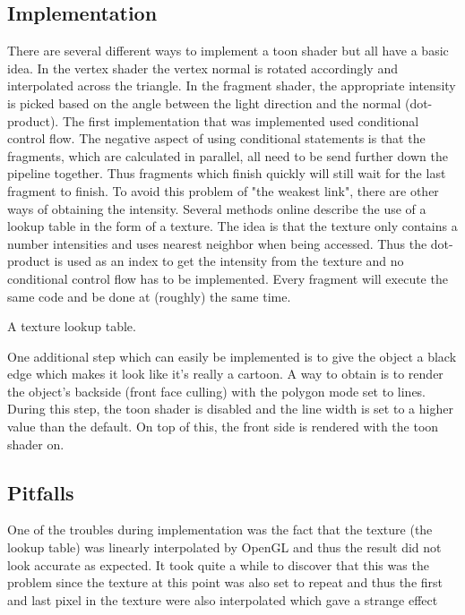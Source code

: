 \documentclass[a4paper,12pt]{article}
\begin{document}
\subsection{Implementation}
\label{sec:ImplementationToonShader}

There are several different ways to implement a toon shader but all have a basic idea. In the vertex shader the vertex normal is rotated accordingly and interpolated across the triangle. In the fragment shader, the appropriate intensity is picked based on the angle between the light direction and the normal (dot-product). The first implementation that was implemented used conditional control flow. The negative aspect of using conditional statements is that the fragments, which are calculated in parallel, all need to be send further down the pipeline together. Thus fragments which finish quickly will still wait for the last fragment to finish. To avoid this problem of "the weakest link", there are other ways of obtaining the intensity. Several methods online describe the use of a lookup table in the form of a texture. The idea is that the texture only contains a number intensities and uses nearest neighbor when being accessed. Thus the dot-product is used as an index to get the intensity from the texture and no conditional control flow has to be implemented. Every fragment will execute the same code and be done at (roughly) the same time.

A texture lookup table.

One additional step which can easily be implemented is to give the object a black edge which makes it look like it's really a cartoon. A way to obtain is to render the object's backside (front face culling) with the polygon mode set to lines. During this step, the toon shader is disabled and the line width is set to a higher value than the default. On top of this, the front side is rendered with the toon shader on.

\subsection{Pitfalls}
\label{sec:PitfallsToonShader}

One of the troubles during implementation was the fact that the texture (the lookup table) was linearly interpolated by OpenGL and thus the result did not look accurate as expected. It took quite a while to discover that this was the problem since the texture at this point was also set to repeat and thus the first and last pixel in the texture were also interpolated which gave a strange effect
\end{document}
